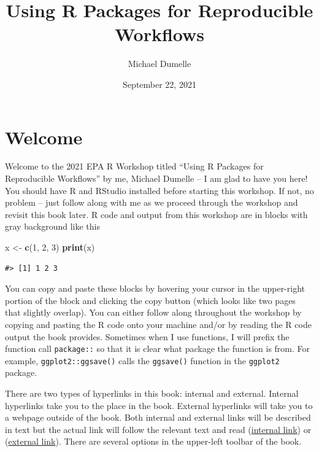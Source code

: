 \documentclass[
]{book}
\title{Using R Packages for Reproducible Workflows}
\author{Michael Dumelle}
\date{September 22, 2021}
\newenvironment{Shaded}{\begin{snugshade}}{\end{snugshade}}
\newcommand{\DecValTok}[1]{\textcolor[rgb]{0.00,0.00,0.81}{#1}}
\newcommand{\KeywordTok}[1]{\textcolor[rgb]{0.13,0.29,0.53}{\textbf{#1}}}
\newcommand{\NormalTok}[1]{#1}
\newcommand{\StringTok}[1]{\textcolor[rgb]{0.31,0.60,0.02}{#1}}
\begin{document}
\maketitle

{
\setcounter{tocdepth}{1}
\tableofcontents
}
\hypertarget{welcome}{%
\chapter*{Welcome}\label{welcome}}

Welcome to the 2021 EPA R Workshop titled ``Using R Packages for Reproducible Workflows'' by me, Michael Dumelle -- I am glad to have you here! You should have R and RStudio installed before starting this workshop. If not, no problem -- just follow along with me as we proceed through the workshop and revisit this book later. R code and output from this workshop are in blocks with gray background like this

\begin{Shaded}
\begin{Highlighting}[]
\NormalTok{x <-}\StringTok{ }\KeywordTok{c}\NormalTok{(}\DecValTok{1}\NormalTok{, }\DecValTok{2}\NormalTok{, }\DecValTok{3}\NormalTok{)}
\KeywordTok{print}\NormalTok{(x)}
\end{Highlighting}
\end{Shaded}

\begin{verbatim}
#> [1] 1 2 3
\end{verbatim}

You can copy and paste these blocks by hovering your cursor in the upper-right portion of the block and clicking the copy button (which looks like two pages that slightly overlap). You can either follow along throughout the workshop by copying and pasting the R code onto your machine and/or by reading the R code output the book provides. Sometimes when I use functions, I will prefix the function call \texttt{package::} so that it is clear what package the function is from. For example, \texttt{ggplot2::ggsave()} calls the \texttt{ggsave()} function in the \texttt{ggplot2} package.

There are two types of hyperlinks in this book: internal and external. Internal hyperlinks take you to the place in the book. External hyperlinks will take you to a webpage outside of the book. Both internal and external links will be described in text but the actual link will follow the relevant text and read (\href{}{internal link}) or (\href{}{external link}). There are several options in the upper-left toolbar of the book.
\end{document}
